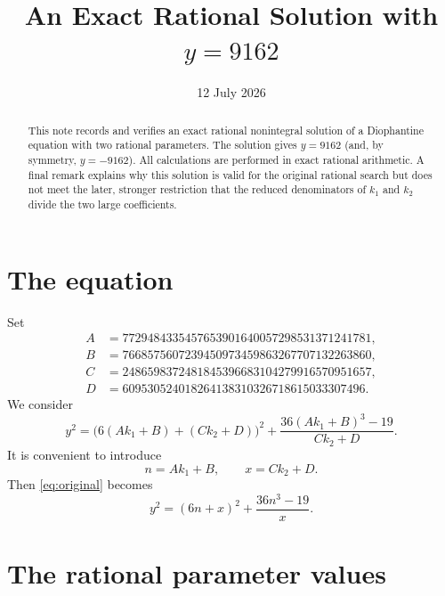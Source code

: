 \documentclass[11pt]{article}
\title{An Exact Rational Solution with \(y=9162\)}
\author{}
\date{12 July 2026}
\begin{document}
\maketitle

\begin{abstract}
This note records and verifies an exact rational nonintegral solution of a
Diophantine equation with two rational parameters.  The solution gives
\(y=9162\) (and, by symmetry, \(y=-9162\)).  All calculations are performed
in exact rational arithmetic.  A final remark explains why this solution is
valid for the original rational search but does not meet the later, stronger
restriction that the reduced denominators of \(k_1\) and \(k_2\) divide the
two large coefficients.
\end{abstract}

\section{The equation}

Set
\begin{align*}
A&=7729484335457653901640057298531371241781,\\
B&=7668575607239450973459863267707132263860,\\
C&=2486598372481845396683104279916570951657,\\
D&= 609530524018264138310326718615033307496.
\end{align*}
We consider
\begin{equation}\label{eq:original}
 y^2=
 \bigl(6(Ak_1+B)+(Ck_2+D)\bigr)^2
 +\frac{36(Ak_1+B)^3-19}{Ck_2+D}.
\end{equation}
It is convenient to introduce
\begin{equation}\label{eq:nxdef}
 n=Ak_1+B,\qquad x=Ck_2+D.
\end{equation}
Then \eqref{eq:original} becomes
\begin{equation}\label{eq:reduced}
 y^2=(6n+x)^2+\frac{36n^3-19}{x}.
\end{equation}

\section{The rational parameter values}
\end{document}

